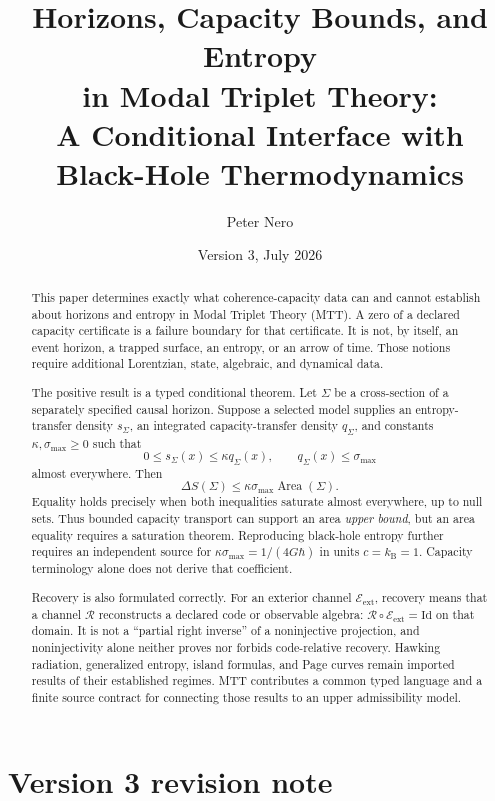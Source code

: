 \documentclass[11pt,a4paper]{article}
\title{\textbf{Horizons, Capacity Bounds, and Entropy\\
in Modal Triplet Theory:}\\
\large A Conditional Interface with Black-Hole Thermodynamics}
\author{Peter Nero}
\date{Version 3, July 2026}
\numberwithin{equation}{section}
\theoremstyle{definition}
\theoremstyle{remark}
\newcommand{\Id}{\mathrm{Id}}
\newcommand{\cE}{\mathcal E}
\newcommand{\cR}{\mathcal R}
\begin{document}
\maketitle

\begin{abstract}
This paper determines exactly what coherence-capacity data can and cannot
establish about horizons and entropy in Modal Triplet Theory (MTT).  A zero
of a declared capacity certificate is a failure boundary for that
certificate.  It is not, by itself, an event horizon, a trapped surface, an
entropy, or an arrow of time.  Those notions require additional Lorentzian,
state, algebraic, and dynamical data.

The positive result is a typed conditional theorem.  Let \(\Sigma\) be a
cross-section of a separately specified causal horizon.  Suppose a selected
model supplies an entropy-transfer density \(s_\Sigma\), an integrated
capacity-transfer density \(q_\Sigma\), and constants
\(\kappa,\sigma_{\max}\geq 0\) such that
\[
  0\leq s_\Sigma(x)\leq\kappa q_\Sigma(x),
  \qquad
  q_\Sigma(x)\leq\sigma_{\max}
\]
almost everywhere.  Then
\[
  \Delta S(\Sigma)\leq
  \kappa\sigma_{\max}\operatorname{Area}(\Sigma).
\]
Equality holds precisely when both inequalities saturate almost
everywhere, up to null sets.  Thus bounded capacity transport can support
an area \emph{upper bound}, but an area equality requires a saturation
theorem.  Reproducing black-hole entropy further requires an independent
source for
\(\kappa\sigma_{\max}=1/(4G\hbar)\) in units \(c=k_{\mathrm B}=1\).
Capacity terminology alone does not derive that coefficient.

Recovery is also formulated correctly.  For an exterior channel
\(\cE_{\mathrm{ext}}\), recovery means that a channel
\(\cR\) reconstructs a declared code or observable algebra:
\(\cR\circ\cE_{\mathrm{ext}}=\Id\) on that domain.  It is not a ``partial
right inverse'' of a noninjective projection, and noninjectivity alone
neither proves nor forbids code-relative recovery.  Hawking radiation,
generalized entropy, island formulas, and Page curves remain imported
results of their established regimes.  MTT contributes a common typed
language and a finite source contract for connecting those results to an
upper admissibility model.
\end{abstract}

\section*{Version 3 revision note}
\end{document}
